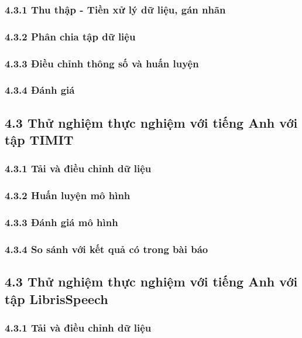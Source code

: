\documentclass{article}
\begin{document}
	\subsubsection{4.3.1 Thu thập - Tiền xử lý dữ liệu, gán nhãn}
	
	\subsubsection{4.3.2 Phân chia tập dữ liệu}
	
	\subsubsection{4.3.3 Điều chỉnh thông số và huấn luyện}
	
	\subsubsection{4.3.4 Đánh giá}
	
	\subsection{4.3 Thử nghiệm thực nghiệm với tiếng Anh với tập TIMIT}
	\subsubsection{4.3.1 Tải và điều chỉnh dữ liệu}
	
	\subsubsection{4.3.2 Huấn luyện mô hình}
	
	\subsubsection{4.3.3 Đánh giá mô hình}
	
	\subsubsection{4.3.4 So sánh với kết quả có trong bài báo}
	
	\subsection{4.3 Thử nghiệm thực nghiệm với tiếng Anh với tập LibrisSpeech}
	\subsubsection{4.3.1 Tải và điều chỉnh dữ liệu}
	
\end{document}
